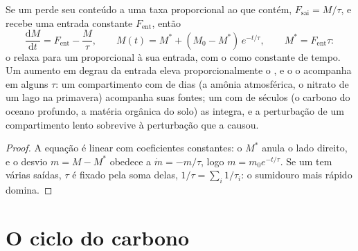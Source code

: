 \begin{theorem}\label{thm:b2:biogeochemical-cycles:box}
Se um  perde seu conteúdo a uma taxa proporcional ao que
contém, $F_{\text{sai}} = M/\tau$, e recebe uma entrada constante
$F_{\text{ent}}$, então
\[
\frac{\mathrm{d}M}{\mathrm{d}t} = F_{\text{ent}} - \frac{M}{\tau},
\qquad
M(t) = M^{*} + (M_0 - M^{*})\,e^{-t/\tau}, \qquad M^{*} = F_{\text{ent}}\tau :
\]
o  relaxa para um  proporcional à sua
entrada, com o  como constante de tempo. Um aumento
em degrau da entrada eleva proporcionalmente o , e o
 o acompanha em alguns $\tau$: um compartimento com  de dias (a amônia atmosférica, o nitrato de um lago na
primavera) acompanha suas fontes; um com  de séculos
(o carbono do oceano profundo, a matéria orgânica do solo) as integra, e
a perturbação de um compartimento lento sobrevive à perturbação que a
causou.
\end{theorem}
\begin{proof}
A equação é linear com coeficientes constantes: o 
$M^{*}$ anula o lado direito, e o desvio $m = M - M^{*}$ obedece a
$\dot m = -m/\tau$, logo $m = m_0 e^{-t/\tau}$. Se um  tem
várias saídas, $\tau$ é fixado pela soma delas, $1/\tau = \sum_i
1/\tau_i$: o sumidouro mais rápido domina.
\end{proof}

\section{O ciclo do carbono}

